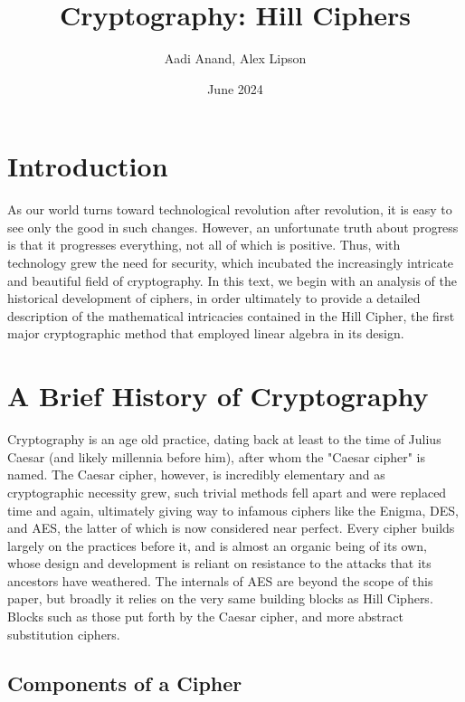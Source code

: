 \documentclass{article}
\title{Cryptography: Hill Ciphers}
\author{Aadi Anand, Alex Lipson}
\date{June 2024}
\begin{document}
\maketitle

\section{Introduction}

As our world turns toward technological revolution after revolution, it is easy to see only the good in such changes. However, an unfortunate truth about progress is that it progresses everything, not all of which is positive. Thus, with technology grew the need for security, which incubated the increasingly intricate and beautiful field of cryptography. In this text, we begin with an analysis of the historical development of ciphers, in order ultimately to provide a detailed description of the mathematical intricacies contained in the Hill Cipher, the first major cryptographic method that employed linear algebra in its design.

\section{A Brief History of Cryptography}

Cryptography is an age old practice, dating back at least to the time of Julius Caesar (and likely millennia before him), after whom the "Caesar cipher" is named. The Caesar cipher, however, is incredibly elementary and as cryptographic necessity grew, such trivial methods fell apart and were replaced time and again, ultimately giving way to infamous ciphers like the Enigma, DES, and AES, the latter of which is now considered near perfect. Every cipher builds largely on the practices before it, and is almost an organic being of its own, whose design and development is reliant on resistance to the attacks that its ancestors have weathered. The internals of AES are beyond the scope of this paper, but broadly it relies on the very same building blocks as Hill Ciphers. Blocks such as those put forth by the Caesar cipher, and more abstract substitution ciphers.

\subsection{Components of a Cipher}
\end{document}
